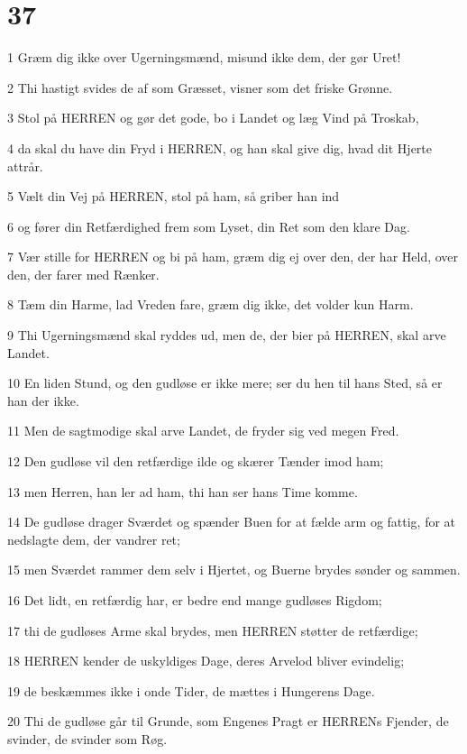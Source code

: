\chapter{37}

\par 1 Græm dig ikke over Ugerningsmænd, misund ikke dem, der gør Uret!
\par 2 Thi hastigt svides de af som Græsset, visner som det friske Grønne.
\par 3 Stol på HERREN og gør det gode, bo i Landet og læg Vind på Troskab,
\par 4 da skal du have din Fryd i HERREN, og han skal give dig, hvad dit Hjerte attrår.
\par 5 Vælt din Vej på HERREN, stol på ham, så griber han ind
\par 6 og fører din Retfærdighed frem som Lyset, din Ret som den klare Dag.
\par 7 Vær stille for HERREN og bi på ham, græm dig ej over den, der har Held, over den, der farer med Rænker.
\par 8 Tæm din Harme, lad Vreden fare, græm dig ikke, det volder kun Harm.
\par 9 Thi Ugerningsmænd skal ryddes ud, men de, der bier på HERREN, skal arve Landet.
\par 10 En liden Stund, og den gudløse er ikke mere; ser du hen til hans Sted, så er han der ikke.
\par 11 Men de sagtmodige skal arve Landet, de fryder sig ved megen Fred.
\par 12 Den gudløse vil den retfærdige ilde og skærer Tænder imod ham;
\par 13 men Herren, han ler ad ham, thi han ser hans Time komme.
\par 14 De gudløse drager Sværdet og spænder Buen for at fælde arm og fattig, for at nedslagte dem, der vandrer ret;
\par 15 men Sværdet rammer dem selv i Hjertet, og Buerne brydes sønder og sammen.
\par 16 Det lidt, en retfærdig har, er bedre end mange gudløses Rigdom;
\par 17 thi de gudløses Arme skal brydes, men HERREN støtter de retfærdige;
\par 18 HERREN kender de uskyldiges Dage, deres Arvelod bliver evindelig;
\par 19 de beskæmmes ikke i onde Tider, de mættes i Hungerens Dage.
\par 20 Thi de gudløse går til Grunde, som Engenes Pragt er HERRENs Fjender, de svinder, de svinder som Røg.
